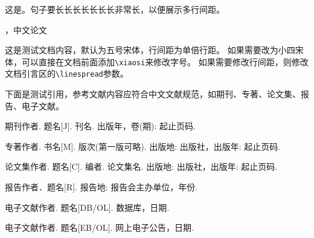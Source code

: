 \documentclass[thesis]{thesis}
\title{\LaTeX中文报告}
\author{佚名}
\begin{document}
\maketitle

\begin{abstractchinese}
这是。句子要长长长长长长长非常长，以便展示多行间距。
\end{abstractchinese}

\begin{keywordchinese}
，中文论文
\end{keywordchinese}


这是测试文档内容，默认为五号宋体，行间距为单倍行距。
如果需要改为小四宋体，可以直接在文档前面添加\verb'\xiaosi'来修改字号。
如果需要修改行间距，则修改文档引言区的\verb'\linespread'参数。

下面是测试引用，参考文献内容应符合中文文献规范，如期刊\cite{journal}、专著\cite{book}、论文集\cite{thesis}、报告\cite{report}、电子文献\cite{database,announcement}。


\begin{thebibliography}{1}
 期刊作者. 题名[J]. 刊名. 出版年，卷(期): 起止页码.

 专著作者. 书名[M]. 版次(第一版可略). 出版地: 出版社，出版年: 起止页码.

 论文集作者. 题名[C]. 编者. 论文集名. 出版地: 出版社，出版年: 起止页码.

 报告作者．题名[R]. 报告地: 报告会主办单位，年份.

 电子文献作者. 题名[DB/OL]. 数据库，日期.

 电子文献作者. 题名[EB/OL]. 网上电子公告，日期.

\end{thebibliography}

% 
% 
\end{document}
